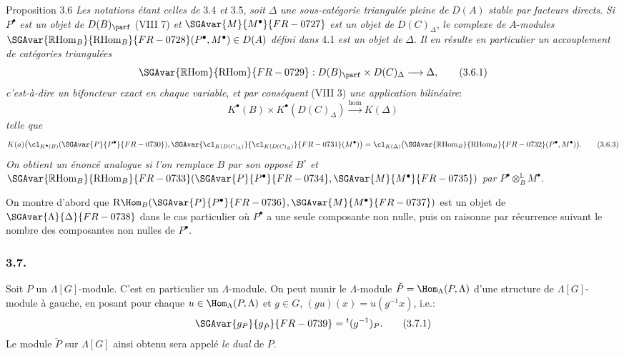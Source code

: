 \begin{statement}{Proposition 3.6}
\emph{Les notations étant celles de} 3.4 \emph{et} 3.5, \emph{soit} $\Delta$ \emph{une sous-catégorie triangulée pleine de} $D(A)$ \emph{stable par facteurs directs}. \emph{Si} $P^\bullet$ \emph{est un objet de} $D(B)_{\parf}$ (VIII 7) \emph{et} $\SGAvar{M}{M^\bullet}{FR-0727}$ \emph{est un objet de} $D(C)_{\Delta}$, \emph{le complexe de} $A$-\emph{modules} $\SGAvar{\mathbb{R}\mathrm{Hom}_B}{\mathrm{RHom}_B}{FR-0728}(P^\bullet,M^\bullet)\in D(A)$ \emph{défini dans} 4.1 \emph{est un objet de} $\Delta$. \emph{Il en résulte en particulier un accouplement de catégories triangulées}
\[
\SGAvar{\mathbb{R}\mathrm{Hom}}{\mathrm{RHom}}{FR-0729}:D(B)_{\parf}\times D(C)_{\Delta}\longrightarrow \Delta,
\tag{3.6.1}
\]
\emph{c'est-à-dire un bifoncteur exact en chaque variable}, \emph{et par conséquent} (VIII 3) \emph{une application bilinéaire}:
\[
K^{\bullet}(B)\times K^{\bullet}(D(C)_{\Delta})\xrightarrow{\operatorname{hom}} K(\Delta)
\tag{3.6.2}
\]
\emph{telle que}
\[
K(a)\bigl(\cl_{K^{\bullet}(B)}(\SGAvar{P}{P^\bullet}{FR-0730}),\SGAvar{\cl_{K(D(C)_{\Lambda})}}{\cl_{K(D(C)_{\Delta})}}{FR-0731}(M^\bullet)\bigr)
=\cl_{K(\Delta)}\bigl(\SGAvar{\mathbb{R}\mathrm{Hom}_B}{\mathrm{RHom}_B}{FR-0732}(P^\bullet,M^\bullet)\bigr).
\tag{3.6.3}
\]
\emph{On obtient un énoncé analogue si l'on remplace} $B$ \emph{par son opposé} $B^\circ$ \emph{et} $\SGAvar{\mathbb{R}\mathrm{Hom}_B}{\mathrm{RHom}_B}{FR-0733}(\SGAvar{P}{P^\bullet}{FR-0734},\SGAvar{M}{M^\bullet}{FR-0735})$ \emph{par} $P^\bullet\otimes_B^{\mathbb{L}}M^\bullet$.
\end{statement}

\begin{prooftext}[Démonstration]
On montre d'abord que $\mathrm{R}\Hom_B(\SGAvar{P}{P^\bullet}{FR-0736},\SGAvar{M}{M^\bullet}{FR-0737})$ est un objet de $\SGAvar{\Lambda}{\Delta}{FR-0738}$ dans le cas particulier où $P^\bullet$ a une seule composante non nulle, puis on raisonne par récurrence suivant le nombre des composantes non nulles de $P^\bullet$.
\end{prooftext}

\subsubsection*{3.7.}

Soit $P$ un $\Lambda[G]$-module. C'est en particulier un $\Lambda$-module. On peut munir le $\Lambda$-module $\check P=\Hom_\Lambda(P,\Lambda)$ d'une structure de $\Lambda[G]$-module à gauche, en posant pour chaque $u\in\Hom_\Lambda(P,\Lambda)$ et $g\in G$, $(gu)(x)=u(g^{-1}x)$, i.e.:
\[
\SGAvar{g_P}{g_{\check P}}{FR-0739}={}^{t}(g^{-1})_P.
\tag{3.7.1}
\]
Le module $\check P$ sur $\Lambda[G]$ ainsi obtenu sera appelé \emph{le dual} de $P$.

